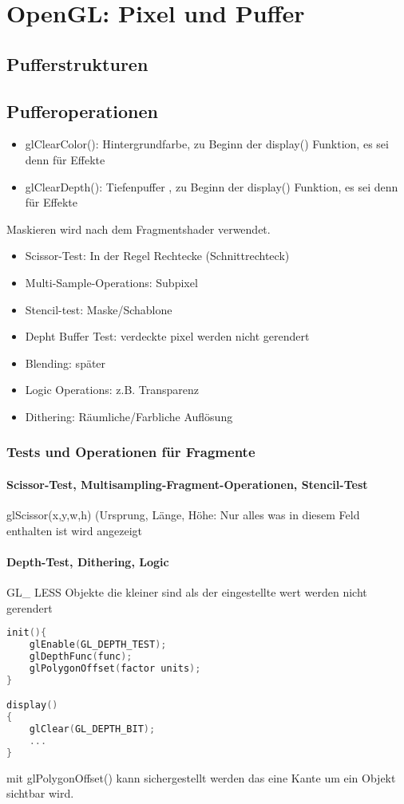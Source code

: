 \chapter{OpenGL: Pixel und Puffer}
\section{Pufferstrukturen}
\section{Pufferoperationen}
\begin{itemize}
\item glClearColor(): Hintergrundfarbe, zu Beginn der display() Funktion, es sei denn für Effekte
\item glClearDepth(): Tiefenpuffer , zu Beginn der display() Funktion, es sei denn für Effekte
\end{itemize}
Maskieren wird nach dem Fragmentshader verwendet.
\begin{itemize}
\item Scissor-Test: In der Regel Rechtecke (Schnittrechteck)
\item Multi-Sample-Operations: Subpixel
\item Stencil-test: Maske/Schablone
\item Depht Buffer Test: verdeckte pixel werden nicht gerendert
\item Blending: später
\item Logic Operations: z.B. Transparenz
\item Dithering: Räumliche/Farbliche Auflösung
\end{itemize}
\subsection{Tests und Operationen für Fragmente}
\subsubsection{Scissor-Test, Multisampling-Fragment-Operationen, Stencil-Test}
glScissor(x,y,w,h) (Ursprung, Länge, Höhe: Nur alles was in diesem Feld enthalten ist wird angezeigt
\subsubsection{Depth-Test, Dithering, Logic}
GL\_ LESS Objekte die kleiner sind als der eingestellte wert werden nicht gerendert
\begin{lstlisting}[language=C++]
init(){
	glEnable(GL_DEPTH_TEST);
	glDepthFunc(func);
	glPolygonOffset(factor units);
}

display()
{
	glClear(GL_DEPTH_BIT);
	...
}
\end{lstlisting}
mit glPolygonOffset() kann sichergestellt werden das eine Kante um ein Objekt sichtbar wird.
